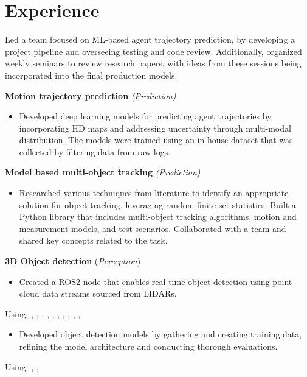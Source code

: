 \section*{\sectionformat Experience}
% 

Led a team focused on ML-based agent trajectory prediction, by developing a project pipeline and overseeing testing and code review. Additionally, organized weekly seminars to review research papers, with ideas from these sessions being incorporated into the final production models.

\textbf{Motion trajectory prediction} \textit{(Prediction)}
\begin{itemize}
    \item Developed deep learning models for predicting agent trajectories by incorporating HD maps and addressing uncertainty through multi-modal distribution. The models were trained using an in-house dataset that was collected by filtering data from raw logs.
\end{itemize}

\textbf{Model based multi-object tracking} \textit{(Prediction)}
\begin{itemize}
    \item Researched various techniques from literature to identify an appropriate solution for object tracking, leveraging random finite set statistics. Built a Python library that includes multi-object tracking algorithms, motion and measurement models, and test scenarios. Collaborated with a team and shared key concepts related to the task.
\end{itemize}

\textbf{3D Object detection} (\textit{Perception})
\begin{itemize}
    \item Created a ROS2 node that enables real-time object detection using point-cloud data streams sourced from LIDARs.
\end{itemize}
Using: , , , , , , , , , , 
\horizontalline
% 
\begin{itemize}
    \item Developed object detection models by gathering and creating training data, refining the model architecture and conducting thorough evaluations.
\end{itemize}
Using: , , 

